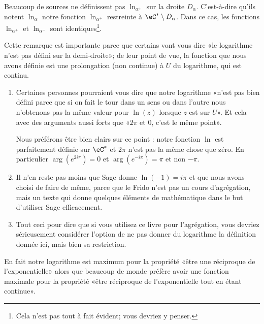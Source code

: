 \begin{remark}      \label{REMooFBLLooDnkmjR}
	Beaucoup de sources\cite{ooGUROooApafph} ne définissent pas \( \ln_{\alpha^{\pm}}\) sur la droite \( D_{\alpha}\). C'est-à-dire qu'ils notent \( \ln_{\alpha}\) notre fonction \( \ln_{\alpha^+}\) restreinte à \( \eC^*\setminus D_{\alpha}\). Dans ce cas, les fonctions \( \ln_{\alpha^+}\) et \( \ln_{\alpha^-}\) sont identiques\footnote{Cela n'est pas tout à fait évident; vous devriez y penser.}.

	Cette remarque est importante parce que certains vont vous dire «le logarithme n'est pas défini sur la demi-droite»; de leur point de vue, la fonction que nous avons définie est une prolongation (non continue) à \( U\) du logarithme, qui est continu.

	\begin{enumerate}
		\item
		      Certaines personnes pourraient vous dire que notre logarithme «n'est pas bien défini parce que si on fait le tour dans un sens ou dans l'autre nous n'obtenons pas la même valeur pour \( \ln(z)\) lorsque \( z\) est sur \( U\)». Et cela avec des arguments aussi forts que «\( 2\pi\) et \( 0\), c'est le même point».

		      Nous préférons être bien clairs sur ce point : notre fonction \( \ln\) est parfaitement définie sur \( \eC^*\) et \( 2\pi\) n'est pas la même chose que zéro. En particulier \( \arg( e^{2i\pi})=0\) et \(  \arg(e^{-i\pi})=\pi\) et non \( -\pi\).
		\item
		      Il n'en reste pas moins que Sage donne \( \ln(-1)=i\pi\) et que nous avons choisi de faire de même, parce que le Frido n'est pas un cours d'agrégation, mais un texte qui donne quelques éléments de mathématique dans le but d'utiliser Sage efficacement.
		\item
		      Tout ceci pour dire que si vous utilisez ce livre pour l'agrégation, vous devriez sérieusement considérer l'option de ne pas donner du logarithme la définition donnée ici, mais bien sa restriction.
	\end{enumerate}

	En fait notre logarithme est maximum pour la propriété «être une réciproque de l'exponentielle» alors que beaucoup de monde préfère avoir une fonction maximale pour la propriété «être réciproque de l'exponentielle tout en étant continue».

\end{remark}

